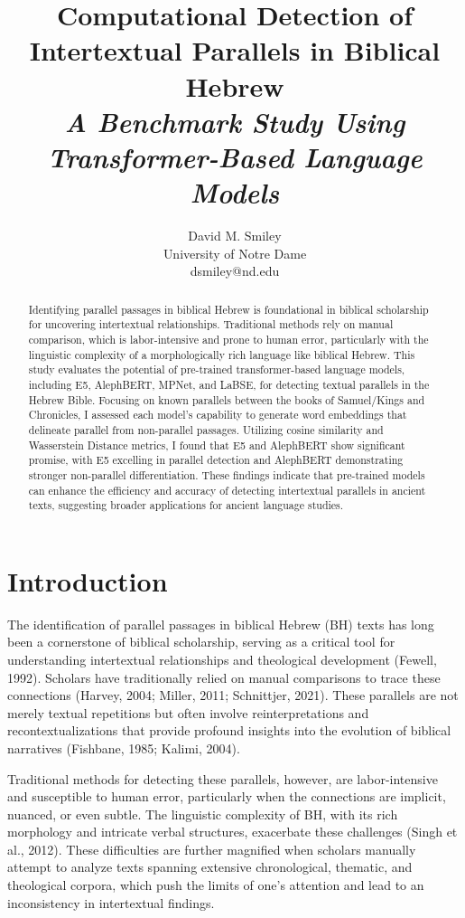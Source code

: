 \documentclass[12pt]{article}
\title{
    \LARGE\bfseries
    Computational Detection of \\
    Intertextual Parallels in Biblical Hebrew \\[1.2ex]
    \Large\itshape
    A Benchmark Study Using \\ Transformer-Based Language Models
}
\author{David M. Smiley\\University of Notre Dame\\dsmiley@nd.edu}
\date{}
\begin{document}
\maketitle

\begin{abstract}
Identifying parallel passages in biblical Hebrew is foundational in biblical scholarship for uncovering intertextual relationships. Traditional methods rely on manual comparison, which is labor-intensive and prone to human error, particularly with the linguistic complexity of a morphologically rich language like biblical Hebrew. This study evaluates the potential of pre-trained transformer-based language models, including E5, AlephBERT, MPNet, and LaBSE, for detecting textual parallels in the Hebrew Bible. Focusing on known parallels between the books of Samuel/Kings and Chronicles, I assessed each model’s capability to generate word embeddings that delineate parallel from non-parallel passages. Utilizing cosine similarity and Wasserstein Distance metrics, I found that E5 and AlephBERT show significant promise, with E5 excelling in parallel detection and AlephBERT demonstrating stronger non-parallel differentiation. These findings indicate that pre-trained models can enhance the efficiency and accuracy of detecting intertextual parallels in ancient texts, suggesting broader applications for ancient language studies. \end{abstract}

\section{Introduction}
The identification of parallel passages in biblical Hebrew (BH) texts has long been a cornerstone of biblical scholarship, serving as a critical tool for understanding intertextual relationships and theological development (Fewell, 1992). Scholars have traditionally relied on manual comparisons to trace these connections (Harvey, 2004; Miller, 2011; Schnittjer, 2021). These parallels are not merely textual repetitions but often involve reinterpretations and recontextualizations that provide profound insights into the evolution of biblical narratives (Fishbane, 1985; Kalimi, 2004).

Traditional methods for detecting these parallels, however, are labor-intensive and susceptible to human error, particularly when the connections are implicit, nuanced, or even subtle. The linguistic complexity of BH, with its rich morphology and intricate verbal structures, exacerbate these challenges (Singh et al., 2012). These difficulties are further magnified when scholars manually attempt to analyze texts spanning extensive chronological, thematic, and theological corpora, which push the limits of one’s attention and lead to an inconsistency in intertextual findings.
\end{document}
